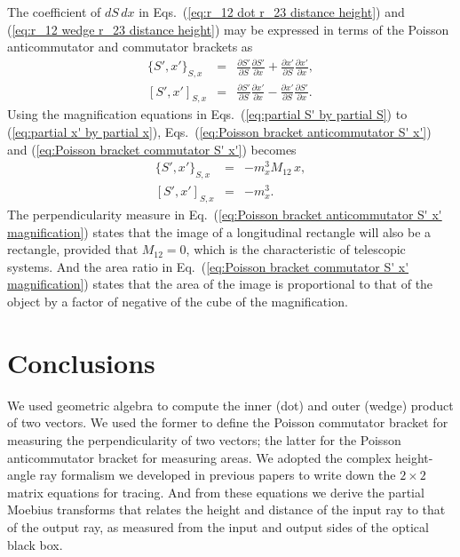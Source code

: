 \documentclass[11pt,twocolumn]{article}
\begin{document}
The coefficient of $dS\,dx$ in Eqs.~(\ref{eq:r_12 dot r_23 distance height}) and (\ref{eq:r_12 wedge r_23 distance height}) may be expressed in terms of the Poisson anticommutator and commutator brackets as
\begin{eqnarray}
\label{eq:Poisson bracket anticommutator S' x'}
\{S',x'\}_{S,x}&=&\frac{\partial S'}{\partial S}\frac{\partial S'}{\partial x}+\frac{\partial x'}{\partial S}\frac{\partial x'}{\partial x},\\
\label{eq:Poisson bracket commutator S' x'}
[S',x']_{S,x}&=&\frac{\partial S'}{\partial S}\frac{\partial x'}{\partial x}-\frac{\partial x'}{\partial S}\frac{\partial S'}{\partial x}.
\end{eqnarray}
Using the magnification equations in Eqs.~(\ref{eq:partial S' by partial S}) to (\ref{eq:partial x' by partial x}), Eqs.~(\ref{eq:Poisson bracket anticommutator S' x'}) and (\ref{eq:Poisson bracket commutator S' x'}) becomes
\begin{eqnarray}
\label{eq:Poisson bracket anticommutator S' x' magnification}
\{S',x'\}_{S,x}&=&-m_x^3M_{12}\,x,\\
\label{eq:Poisson bracket commutator S' x' magnification}
[S',x']_{S,x}&=&-m_x^3.
\end{eqnarray}
The perpendicularity measure in Eq.~(\ref{eq:Poisson bracket anticommutator S' x' magnification}) states that the image of a longitudinal rectangle will also be a rectangle, provided that $M_{12}=0$, which is the characteristic of telescopic systems\cite{KleinFurtak_1986_Optics_p179}.   And the area ratio in Eq.~(\ref{eq:Poisson bracket commutator S' x' magnification}) states that the area of the image is proportional to that of the object by a factor of negative of the cube of the magnification.



\section{Conclusions}

We used geometric algebra to compute the inner (dot) and outer (wedge) product of two vectors.  We used the former to define the Poisson commutator bracket for measuring the perpendicularity of two vectors; the latter for the Poisson anticommutator bracket for measuring areas.  We adopted the complex height-angle ray formalism we developed in previous papers to write down the $2\times 2$ matrix equations for tracing.  And from these equations we derive the partial Moebius transforms that relates the height and distance of the input ray to that of the output ray, as measured from the input and output sides of the optical black box.  
\end{document}
